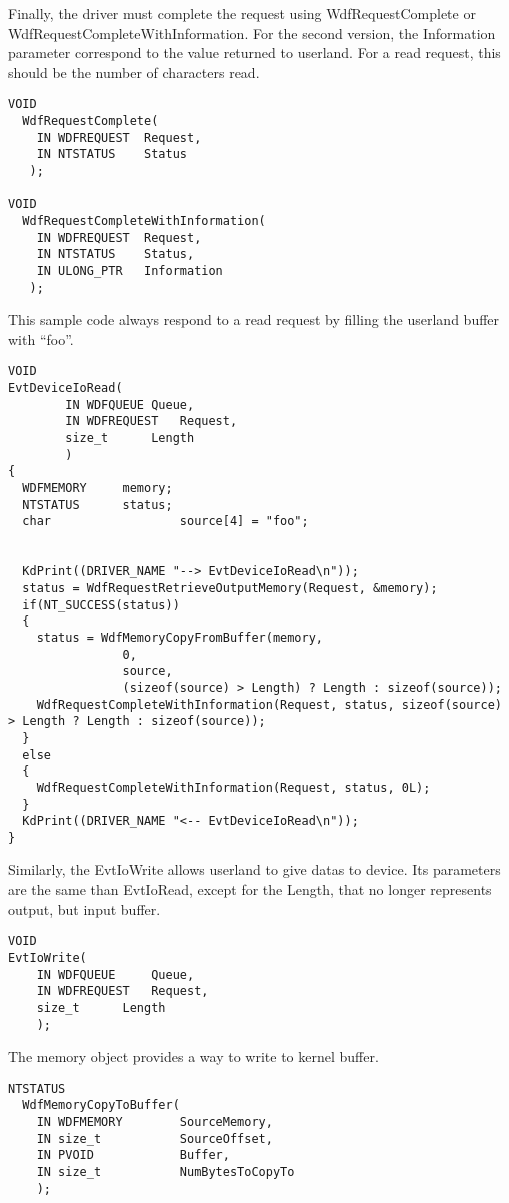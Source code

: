 \documentclass[11pt]{report}
\begin{document}
Finally, the driver must complete the request using
WdfRequestComplete or WdfRequestCompleteWithInformation.
For the second version, the Information parameter
correspond to the value returned to userland.
For a read request, this should be the number of characters read.
\begin{lstlisting}
VOID
  WdfRequestComplete(
    IN WDFREQUEST  Request,
    IN NTSTATUS    Status
   );

VOID
  WdfRequestCompleteWithInformation(
    IN WDFREQUEST  Request,
    IN NTSTATUS    Status,
    IN ULONG_PTR   Information
   );
\end{lstlisting}

This sample code always respond to a read request by filling
the userland buffer with ``foo''.
\begin{lstlisting}
VOID 
EvtDeviceIoRead(
        IN WDFQUEUE	Queue,
        IN WDFREQUEST	Request,
        size_t		Length
        )
{
  WDFMEMORY		memory;
  NTSTATUS		status;
  char                  source[4] = "foo";
  

  KdPrint((DRIVER_NAME "--> EvtDeviceIoRead\n"));
  status = WdfRequestRetrieveOutputMemory(Request, &memory);
  if(NT_SUCCESS(status))
  {
    status = WdfMemoryCopyFromBuffer(memory,
                0,
                source,
                (sizeof(source) > Length) ? Length : sizeof(source));
    WdfRequestCompleteWithInformation(Request, status, sizeof(source) > Length ? Length : sizeof(source));
  }
  else
  {
    WdfRequestCompleteWithInformation(Request, status, 0L);
  }
  KdPrint((DRIVER_NAME "<-- EvtDeviceIoRead\n"));
}
\end{lstlisting}

Similarly, the EvtIoWrite allows userland to give datas to device.
Its parameters are the same than EvtIoRead, except for the Length,
that no longer represents output, but input buffer.
\begin{lstlisting}
VOID 
EvtIoWrite(
    IN WDFQUEUE		Queue,
    IN WDFREQUEST	Request,
    size_t		Length
    );
\end{lstlisting}

The memory object provides a way to write to kernel buffer.
\begin{lstlisting}
NTSTATUS
  WdfMemoryCopyToBuffer(
    IN WDFMEMORY        SourceMemory,
    IN size_t           SourceOffset,
    IN PVOID            Buffer,
    IN size_t           NumBytesToCopyTo
    );
\end{lstlisting}
\end{document}
